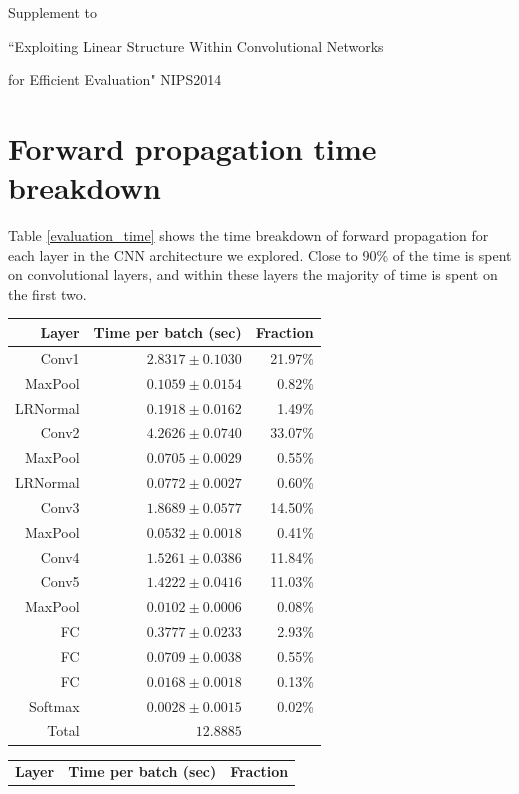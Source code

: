 \documentclass{article} %
\begin{document}
\centerline{\Large Supplement to}
\centerline{\Large ``Exploiting Linear Structure Within Convolutional Networks} 
\centerline{\Large for Efficient Evaluation" NIPS2014}




\section{Forward propagation time breakdown}
Table \ref{evaluation_time} shows the time breakdown of forward propagation for each layer in the CNN architecture we explored. Close to 90\% of the time is spent on convolutional layers, and within these layers the majority of time is spent on the first two. 

\begin{table}[h]
\small
\parbox{.5\linewidth}{
\centering
\begin{tabular}{rrr}
\hline
{\bf Layer} & {\bf Time per batch (sec)} & {\bf Fraction} \\
\hline
Conv1 & $2.8317 \pm 0.1030 $ & 21.97\% \\
MaxPool & $0.1059 \pm 0.0154$ & 0.82\% \\
LRNormal & $0.1918 \pm 0.0162$ & 1.49\% \\
Conv2 & $4.2626 \pm 0.0740 $ & 33.07\% \\
MaxPool & $0.0705  \pm 0.0029$ & 0.55\% \\
LRNormal & $0.0772\pm 0.0027$ & 0.60\% \\
Conv3 & $1.8689\pm 0.0577$ & 14.50\% \\
MaxPool & $0.0532\pm 0.0018 $ & 0.41\% \\
Conv4 & $1.5261\pm 0.0386$ & 11.84\% \\
Conv5 & $1.4222\pm 0.0416$& 11.03\% \\
MaxPool & $0.0102\pm 0.0006 $ & 0.08\% \\
FC & $0.3777\pm 0.0233$ & 2.93\% \\
FC & $0.0709  \pm 0.0038$ & 0.55\% \\
FC & $0.0168 \pm 0.0018$ & 0.13\% \\
Softmax & $0.0028 \pm 0.0015$ & 0.02\%\\
\hline 
Total & $12.8885$ & \\
\hline
\end{tabular}
}
\parbox{.5\linewidth}{
\centering
\begin{tabular}{rrr}
\hline
{\bf Layer} & {\bf Time per batch (sec)} & {\bf Fraction} \\

\end{tabular}}
\end{table}
\end{document}
